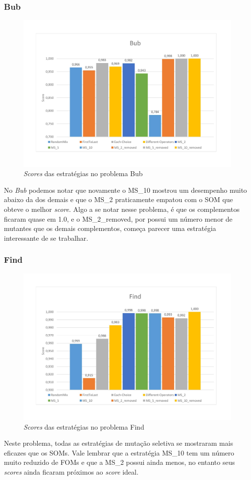 \subsubsection{Bub}
\begin{figure}[H]
\includegraphics[width=1\textwidth]{graficos/problems/bub.jpg}
\caption{\textit{Scores} das estratégias no problema Bub}
\label{fig:bub}
\end{figure}
No \textit{Bub} podemos notar que novamente o MS\_10 mostrou um desempenho muito abaixo da dos demais e que o MS\_2 praticamente empatou com o SOM que obteve o melhor \textit{score}. Algo a se notar nesse problema, é que os complementos ficaram quase em 1.0, e o MS\_2\_removed, por possui um número menor de mutantes que os demais complementos, começa parecer uma estratégia interessante de se trabalhar.

\subsubsection{Find}
\begin{figure}[H]
\includegraphics[width=1\textwidth]{graficos/problems/find.jpg}
\caption{\textit{Scores} das estratégias no problema Find}
\label{fig:find}
\end{figure}
Neste problema, todas as estratégias de mutação seletiva se mostraram mais eficazes que os SOMs. Vale lembrar que a estratégia MS\_10 tem um número muito reduzido de FOMs e que a  MS\_2 possui ainda menos, no entanto seus \textit{scores} ainda ficaram próximos ao \textit{score} ideal.

